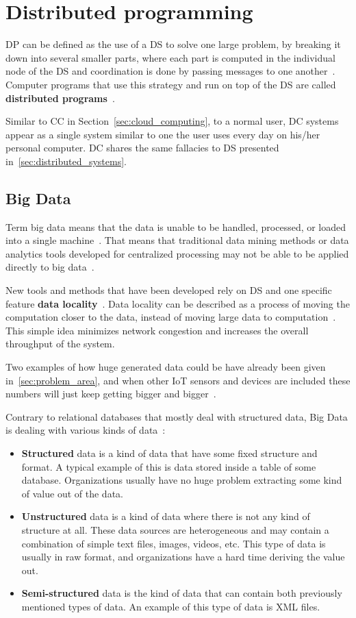 \section{Distributed programming}\label{sec:distributed_computing}
%
DP can be defined as the use of a DS to solve one large problem, by breaking it down into several smaller parts, where each part is computed in the individual node of the DS and coordination is done by passing messages to one another~\cite{0019513}. Computer programs that use this strategy and run on top of the DS are called \textbf{distributed programs}~\cite{Vera16, andrews2000foundations}. 

Similar to CC in Section~\ref{sec:cloud_computing}, to a normal user, DC systems appear as a single system similar to one the user uses every day on his/her personal computer. DC shares the same fallacies to DS presented in~\ref{sec:distributed_systems}.
%
%
\subsection{Big Data}\label{sec:big_data}
%
Term big data means that the data is unable to be handled, processed, or loaded into a single machine~\cite{FisherDCD12}. That means that traditional data mining methods or data analytics tools developed for centralized processing may not be able to be applied directly to big data~\cite{Tsai2015}. 

New tools and methods that have been developed rely on DS and one specific feature \textbf{data locality}~\label{ds:data_locality}. Data locality can be described as a process of moving the computation closer to the data, instead of moving large data to computation~\cite{GuoFZ12}. This simple idea minimizes network congestion and increases the overall throughput of the system.

Two examples of how huge generated data could be have already been given in~\ref{sec:problem_area}, and when other IoT sensors and devices are included these numbers will just keep getting bigger and bigger~\cite{SarigiannidisLR20}.

Contrary to relational databases that mostly deal with structured data, Big Data is dealing with various kinds of data~\cite{FisherDCD12, Tsai2015, GuoFZ12}:

\begin{itemize}
	\item \textbf{Structured} data is a kind of data that have some fixed structure and format. A typical example of this is data stored inside a table of some database. Organizations usually have no huge problem extracting some kind of value out of the data.
	\item \textbf{Unstructured} data is a kind of data where there is not any kind of structure at all. These data sources are heterogeneous and may contain a combination of simple text files, images, videos, etc. This type of data is usually in raw format, and organizations have a hard time deriving the value out.
	\item \textbf{Semi-structured} data is the kind of data that can contain both previously mentioned types of data. An example of this type of data is XML files.
\end{itemize}

